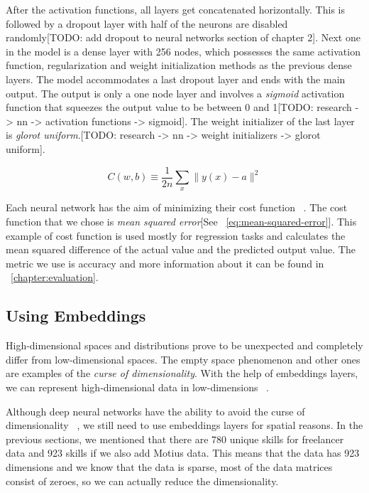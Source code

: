After the activation functions, all layers get concatenated horizontally. This is followed by a dropout layer with half of the neurons are disabled randomly[TODO: add dropout to neural networks section of chapter 2]. Next one in the model is a dense layer with 256 nodes, which possesses the same activation function, regularization and weight initialization methods as the previous dense layers. The model accommodates a last dropout layer and ends with the main output. The output is only a one node layer and involves a \textit{sigmoid} activation function that squeezes the output value to be between 0 and 1[TODO: research -> nn -> activation functions -> sigmoid]. The weight initializer of the last layer is \textit{glorot uniform}.[TODO: research -> nn -> weight initializers -> glorot uniform].

\begin{equation}
C(w, b) \equiv \frac{1}{2 n} \sum_{x}\|y(x)-a\|^{2}
\label{eq:mean-squared-error}
\end{equation}

Each neural network has the aim of minimizing their cost function ~\parencite{Goodfellow-et-al-2016}. The cost function that we chose is \textit{mean squared error}[See ~\autoref{eq:mean-squared-error}]. This example of cost function is used mostly for regression tasks and calculates the mean squared difference of the actual value and the predicted output value. The metric we use is accuracy and more information about it can be found in ~\autoref{chapter:evaluation}.


\subsection{Using Embeddings}\label{subsection:using-embeddings}

High-dimensional spaces and distributions  prove to be unexpected and completely differ from low-dimensional spaces. The empty space phenomenon and other ones are examples of the \textit{curse of dimensionality}. With the help of embeddings layers, we can represent high-dimensional data in low-dimensions  ~\parencite{lee2007nonlinear}.

Although deep neural networks have the ability to avoid the  curse of dimensionality ~\parencite{poggio2017and}, we still need to use embeddings layers for spatial reasons. In the previous sections, we mentioned that there are 780 unique skills for freelancer data and 923 skills if we also add Motius data. This means that the data has 923 dimensions and we know that the data is sparse, most of the data matrices consist of zeroes, so we can actually reduce the dimensionality. 

